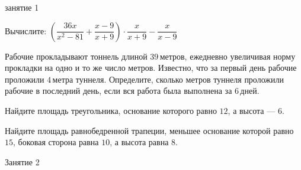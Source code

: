 %

\begin{class}[number=1]
	\begin{listofex}
		\item занятие 1
	\end{listofex}
\end{class}

\begin{homework}[number=1]
	\begin{listofex}
		\item Вычислите: \quad \(\left( \dfrac{36x}{x^2-81}+\dfrac{x-9}{x+9} \right)\cdot\dfrac{x}{x+9}-\dfrac{x}{x-9}\)
		\item Рабочие прокладывают тоннель длиной \( 39 \) метров, ежедневно увеличивая норму прокладки на одно и то же число метров. Известно, что за первый день рабочие проложили \( 4 \) метра туннеля. Определите, сколько метров туннеля проложили рабочие в последний день, если вся работа была выполнена за \( 6 \) дней.
		\item Найдите площадь треугольника, основание которого равно \( 12 \), а высота --- \( 6 \).
		\item Найдите площадь равнобедренной трапеции, меньшее основание которой равно \( 15 \), боковая сторона равна \( 10 \), а высота равна \( 8 \).
	\end{listofex}
\end{homework}

\begin{class}[number=2]
	\begin{listofex}
		\item Занятие 2
	\end{listofex}
\end{class}


